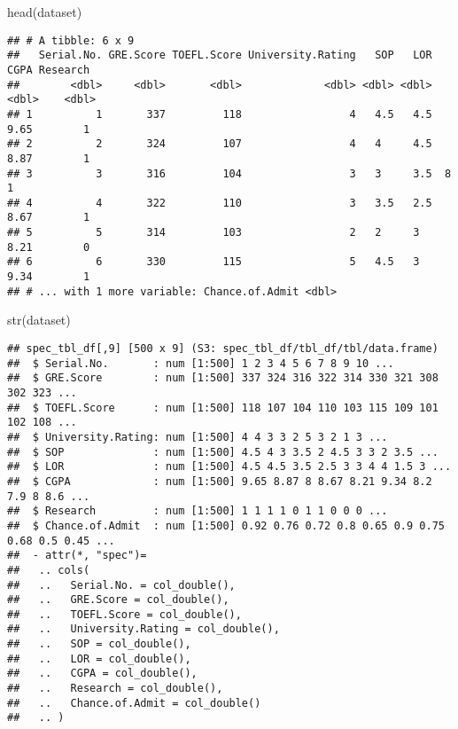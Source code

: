 \documentclass[
]{article}
\newenvironment{Shaded}{\begin{snugshade}}{\end{snugshade}}
\newcommand{\FunctionTok}[1]{\textcolor[rgb]{0.00,0.00,0.00}{#1}}
\newcommand{\NormalTok}[1]{#1}
\begin{document}
\begin{Shaded}
\begin{Highlighting}[]
\FunctionTok{head}\NormalTok{(dataset)}
\end{Highlighting}
\end{Shaded}

\begin{verbatim}
## # A tibble: 6 x 9
##   Serial.No. GRE.Score TOEFL.Score University.Rating   SOP   LOR  CGPA Research
##        <dbl>     <dbl>       <dbl>             <dbl> <dbl> <dbl> <dbl>    <dbl>
## 1          1       337         118                 4   4.5   4.5  9.65        1
## 2          2       324         107                 4   4     4.5  8.87        1
## 3          3       316         104                 3   3     3.5  8           1
## 4          4       322         110                 3   3.5   2.5  8.67        1
## 5          5       314         103                 2   2     3    8.21        0
## 6          6       330         115                 5   4.5   3    9.34        1
## # ... with 1 more variable: Chance.of.Admit <dbl>
\end{verbatim}

\begin{Shaded}
\begin{Highlighting}[]
\FunctionTok{str}\NormalTok{(dataset)}
\end{Highlighting}
\end{Shaded}

\begin{verbatim}
## spec_tbl_df[,9] [500 x 9] (S3: spec_tbl_df/tbl_df/tbl/data.frame)
##  $ Serial.No.       : num [1:500] 1 2 3 4 5 6 7 8 9 10 ...
##  $ GRE.Score        : num [1:500] 337 324 316 322 314 330 321 308 302 323 ...
##  $ TOEFL.Score      : num [1:500] 118 107 104 110 103 115 109 101 102 108 ...
##  $ University.Rating: num [1:500] 4 4 3 3 2 5 3 2 1 3 ...
##  $ SOP              : num [1:500] 4.5 4 3 3.5 2 4.5 3 3 2 3.5 ...
##  $ LOR              : num [1:500] 4.5 4.5 3.5 2.5 3 3 4 4 1.5 3 ...
##  $ CGPA             : num [1:500] 9.65 8.87 8 8.67 8.21 9.34 8.2 7.9 8 8.6 ...
##  $ Research         : num [1:500] 1 1 1 1 0 1 1 0 0 0 ...
##  $ Chance.of.Admit  : num [1:500] 0.92 0.76 0.72 0.8 0.65 0.9 0.75 0.68 0.5 0.45 ...
##  - attr(*, "spec")=
##   .. cols(
##   ..   Serial.No. = col_double(),
##   ..   GRE.Score = col_double(),
##   ..   TOEFL.Score = col_double(),
##   ..   University.Rating = col_double(),
##   ..   SOP = col_double(),
##   ..   LOR = col_double(),
##   ..   CGPA = col_double(),
##   ..   Research = col_double(),
##   ..   Chance.of.Admit = col_double()
##   .. )
\end{verbatim}
\end{document}
